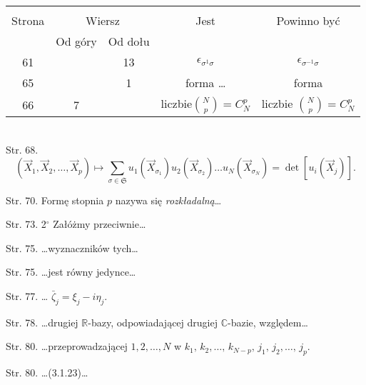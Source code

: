 \documentclass[a4paper,11pt]{article}
\numberwithin{equation}{section}
\begin{document}




\begin{center}

  \begin{tabular}{|c|c|c|c|c|}
    \hline
    & \multicolumn{2}{c|}{} & & \\
    Strona & \multicolumn{2}{c|}{Wiersz} & Jest
                              & Powinno być \\ \cline{2-3}
    & Od góry & Od dołu & & \\
    \hline
    61  & & 13 & $\epsilon_{ \sigma^{ 1 } \sigma }$
           & $\epsilon_{ \sigma^{ -1 } \sigma }$ \\
    65  & &  1 & forma \ldots & forma \\
    66  &  7 & & liczbie${ N \choose p } =  C^{ p }_{ N } $
           & liczbie ${ N \choose p } =  C^{ p }_{ N } $ \\
    \hline
  \end{tabular}

\end{center}

\VerSpaceTwo


\noindent \\
Str. 68.
$$( \vec{ X }_{ 1 }, \vec{ X }_{ 2 }, \ldots, \vec{ X }_{ p })
\mapsto \sum_{\sigma \in \mathfrak{ S } } u_{ 1 }( \vec{ X }_{
  \sigma_{ 1 } } ) u_{ 2 }( \vec{ X }_{ \sigma_{ 2 } } ) \ldots u_{ N
}( \vec{ X }_{ \sigma_{ N } } ) = \det[ u_{ i }( \vec{ X }_{ j } ) ]
\textrm{.}$$

Str. 70. Formę stopnia $p$ nazywa się \textit{rozkładalną}\ldots

Str. 73. 2$^{\circ}$ Załóżmy przeciwnie\ldots

Str. 75. \ldots wyznaczników tych\ldots

Str. 75. \ldots jest równy jedynce\ldots

Str. 77. \ldots
$\bar{ \zeta }_{ j } = \xi_{ j } - i \eta_{ j }$.

Str. 78. \ldots drugiej $\mathbb{R}$-bazy, odpowiadającej
drugiej $\mathbb{C}$-bazie, względem\ldots

Str. 80. \ldots przeprowadzającej $1, 2, \ldots, N$ w
$k_{ 1 }, \, k_{ 2 }, \ldots, \, k_{ N - p }, \, j_{ 1 }, \, j_{ 2 },
\ldots, \, j_{ p }$.

Str. 80. \ldots (3.1.23)\ldots
\end{document}
